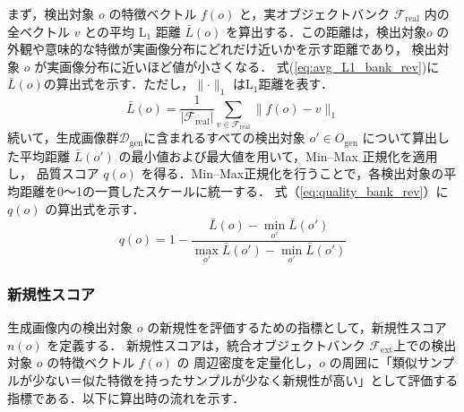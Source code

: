 \documentclass[Japanese]{dicomopapers}
\begin{document}
     まず，検出対象 \(o\) の特徴ベクトル \(f(o)\) と，実オブジェクトバンク \(\mathcal{F}_{\mathrm{real}}\) 内の全ベクトル \(v\) との平均 L\(_1\) 距離
     \(\bar L(o)\) を算出する．この距離は，検出対象\(o\) の外観や意味的な特徴が実画像分布にどれだけ近いかを示す距離であり，
     検出対象 \(o\) が実画像分布に近いほど値が小さくなる．
     式(\ref{eq:avg_L1_bank_rev})に\(\bar L(o)\)の算出式を示す．ただし，\(\lVert \cdot \rVert_1\) はL\(_1\)距離を表す．
     \begin{equation}
       \bar L(o)=\frac{1}{|\mathcal{F}_{\mathrm{real}}|}
                 \sum_{v\in\mathcal{F}_{\mathrm{real}}} \lVert f(o)-v\rVert_1
       \label{eq:avg_L1_bank_rev}
     \end{equation}
     続いて，生成画像群$\mathcal{D}_{\mathrm{gen}}$に含まれるすべての検出対象 \(o'\in O_{\mathrm{gen}}\) について算出した平均距離 \(\bar L(o')\) の最小値および最大値を用いて，Min–Max 正規化を適用し，
     品質スコア \(q(o)\) を得る．Min–Max正規化を行うことで，各検出対象の平均距離を0～1の一貫したスケールに統一する．
     式（\ref{eq:quality_bank_rev}）に \(q(o)\) の算出式を示す．
     \begin{equation}
       q(o)=1-\frac{\bar L(o)-\min_{o'}\bar L(o')}
                       {\max_{o'}\bar L(o')-\min_{o'}\bar L(o')}
       \label{eq:quality_bank_rev}
     \end{equation}
    \subsubsection{新規性スコア}

    生成画像内の検出対象 \(o\) の新規性を評価するための指標として，新規性スコア \(n(o)\) を定義する．
    新規性スコアは，統合オブジェクトバンク \(\mathcal{F}_{\mathrm{ext}}\)上での検出対象 \(o\) の特徴ベクトル \(f(o)\) の
    周辺密度を定量化し，\(o\) の周囲に「類似サンプルが少ない＝似た特徴を持ったサンプルが少なく新規性が高い」として評価する指標である．以下に算出時の流れを示す．
\end{document}
